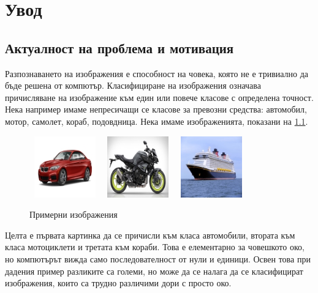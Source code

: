 \chapter{Увод}

\label{Chapter1}


\section{Актуалност на проблема и мотивация}

Разпознаването на изображения е способност на човека, която не е тривиално да бъде решена от компютър. Класифициране на изображения означава причисляване на изображение към един или повече класове с определена точност. Нека например имаме непресичащи се класове за превозни средства: автомобил, мотор, самолет, кораб, подовдница. Нека имаме изображенията, показани на \ref{fig:example_images}.\\[0.5cm]

\begin{figure}[h!]
\centering
\includegraphics[width=115px,height=100px]{Figures/car.jpg}
\includegraphics[width=115px,height=100px]{Figures/motorcycle.jpg}
\includegraphics[width=115px,height=100px]{Figures/ship.jpg}
\caption{Примерни изображения}
\label{fig:example_images}
\end{figure}

Целта е първата картинка да се причисли към класа автомобили, втората към класа мотоциклети и третата към кораби. Това е елементарно за човешкото око, но компютърът вижда само последователност от нули и единици. Освен това при дадения пример разликите са големи, но може да се налага да се класифицират изображения, които са трудно различими дори с просто око.

